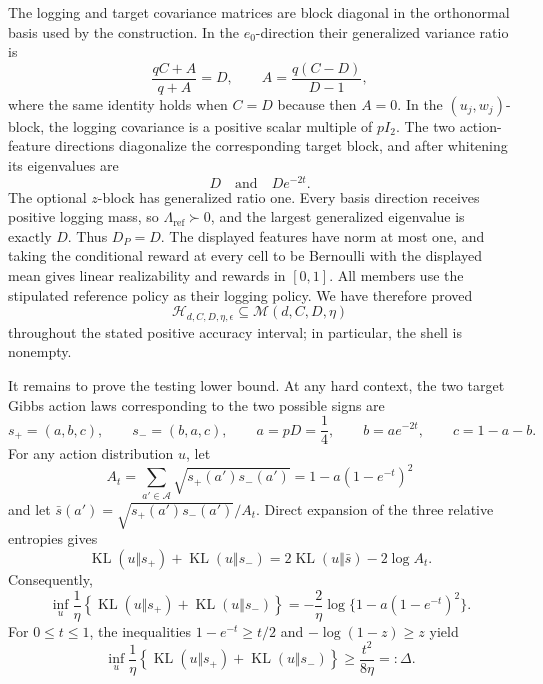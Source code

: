 The logging and target covariance matrices are block diagonal in the orthonormal basis used by the construction. In the \(e_0\)-direction their generalized variance ratio is
\[
\frac{qC+A}{q+A}=D,
\qquad
A=\frac{q(C-D)}{D-1},
\]
where the same identity holds when \(C=D\) because then \(A=0\). In the \((u_j,w_j)\)-block, the logging covariance is a positive scalar multiple of \(pI_2\). The two action-feature directions diagonalize the corresponding target block, and after whitening its eigenvalues are
\[
D
\quad\text{and}\quad
De^{-2t}.
\]
The optional \(z\)-block has generalized ratio one. Every basis direction receives positive logging mass, so \(\Lambda_{\mathrm{ref}}\succ0\), and the largest generalized eigenvalue is exactly \(D\). Thus \(D_P=D\). The displayed features have norm at most one, and taking the conditional reward at every cell to be Bernoulli with the displayed mean gives linear realizability and rewards in \([0,1]\). All members use the stipulated reference policy as their logging policy. We have therefore proved
\[
\mathcal H_{d,C,D,\eta,\epsilon}
\subseteq\mathcal M(d,C,D,\eta)
\]
throughout the stated positive accuracy interval; in particular, the shell is nonempty.

It remains to prove the testing lower bound. At any hard context, the two target Gibbs action laws corresponding to the two possible signs are
\[
s_+=(a,b,c),
\qquad
s_-=(b,a,c),
\qquad
a=pD=\frac14,
\qquad
b=ae^{-2t},
\qquad
c=1-a-b.
\]
For any action distribution \(u\), let
\[
A_t=\sum_{a'\in\mathcal A}\sqrt{s_+(a')s_-(a')}
=1-a(1-e^{-t})^2
\]
and let \(\bar s(a')=\sqrt{s_+(a')s_-(a')}/A_t\). Direct expansion of the three relative entropies gives
\[
\operatorname{KL}(u\Vert s_+)+\operatorname{KL}(u\Vert s_-)
=2\operatorname{KL}(u\Vert\bar s)-2\log A_t.
\]
Consequently,
\[
\inf_u\frac1\eta\left\{
\operatorname{KL}(u\Vert s_+)+\operatorname{KL}(u\Vert s_-)
\right\}
=-\frac2\eta\log\{1-a(1-e^{-t})^2\}.
\]
For \(0\le t\le1\), the inequalities \(1-e^{-t}\ge t/2\) and \(-\log(1-z)\ge z\) yield
\[
\inf_u\frac1\eta\left\{
\operatorname{KL}(u\Vert s_+)+\operatorname{KL}(u\Vert s_-)
\right\}
\ge\frac{t^2}{8\eta}=:\Delta.
\]

